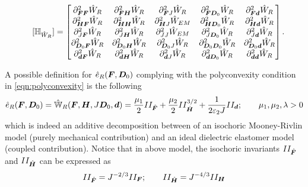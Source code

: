 \begin{equation}
	\quad[\mathbb{H}_{\hat{W}_{R}}] = \begin{bmatrix}
		\partial^2_{\boldsymbol{F}\boldsymbol{F}}{\hat{W}_{R}} & \partial^2_{\boldsymbol{F}\boldsymbol{H}}{\hat{W}_{R}} & 
		\partial^2_{\boldsymbol{F}{J}}{\hat{W}_{R}} & 
		\partial^2_{\boldsymbol{F}\boldsymbol{D}_0}{\hat{W}_{R}} & \partial^2_{\boldsymbol{F}\boldsymbol{d}}{\hat{W}_{R}}\\
		\partial^2_{\boldsymbol{H}\boldsymbol{F}}{\hat{W}_{R}} & \partial^2_{\boldsymbol{H}\boldsymbol{H}}{\hat{W}_{R}} & \partial^2_{\boldsymbol{H}{J}}{\hat{W}_{EM}}&
		\partial^2_{\boldsymbol{H}\boldsymbol{D}_0}{\hat{W}_{R}} & \partial^2_{\boldsymbol{H}\boldsymbol{d}}{\hat{W}_{R}}\\
		\partial^2_{J\boldsymbol{F}}{\hat{W}_{R}} & 
		\partial^2_{J\boldsymbol{H}}{\hat{W}_{R}} & 
		\partial^2_{J{J}}{\hat{W}_{EM}} & 
		\partial^2_{{J}\boldsymbol{D}_0}{\hat{W}_{R}} & 
		\partial^2_{{J}\boldsymbol{d}}{\hat{W}_{R}}\\
		\partial^2_{\boldsymbol{D}_0\boldsymbol{F}}{\hat{W}_{R}} & \partial^2_{\boldsymbol{D}_0\boldsymbol{H}}{\hat{W}_{R}} & \partial^2_{\boldsymbol{D}_0{J}}{\hat{W}_{R}}&
		\partial^2_{\boldsymbol{D}_0\boldsymbol{D}_0}{\hat{W}_{R}} & \partial^2_{\boldsymbol{D}_0\boldsymbol{d}}{\hat{W}_{R}}\\
		\partial^2_{\boldsymbol{d}\boldsymbol{F}}{\hat{W}_{R}} & \partial^2_{\boldsymbol{d}\boldsymbol{H}}{\hat{W}_{R}} & 
		\partial^2_{\boldsymbol{d}{J}}{\hat{W}_{R}}&
		\partial^2_{\boldsymbol{d}\boldsymbol{D}_0}{\hat{W}_{R}} & \partial^2_{\boldsymbol{d}\boldsymbol{d}}{\hat{W}_{R}}
	\end{bmatrix}.
\end{equation}



A possible definition for $\hat{e}_R(\boldsymbol{F},\boldsymbol{D}_0)$ complying with the polyconvexity condition in \eqref{eqn:polyconvexity} is the following
%
\begin{equation}
\hat{e}_R(\vect{F},\vect{D}_0) =  \hat{\mathbb{W}}_R(\vect{F},\vect{H},J\vect{D}_0,\vect{d})=\frac{\mu_1}{2}II_{\hat{\vect{F}}}+ \frac{\mu_2}{2}II_{\hat{\vect{H}}}^{3/2}
%
+ \frac{1}{2\varepsilon_2J}II_{\vect{d}};\qquad \mu_1, \mu_2, \lambda >0
\end{equation}
%
which is indeed an additive decomposition between of an
isochoric Mooney-Rivlin model (purely mechanical contribution) and an ideal dielectric elastomer model (coupled contribution). Notice that in above model, the isochoric invariants $II_{\hat{\boldsymbol{F}}}$ and $II_{\hat{\boldsymbol{H}}}$ can be expressed as
%
\begin{equation}
	II_{\hat{\boldsymbol{F}}}=J^{-2/3}II_{{\boldsymbol{F}}};\qquad 
	II_{\hat{\boldsymbol{H}}}=J^{-4/3}II_{{\boldsymbol{H}}}	
\end{equation}

